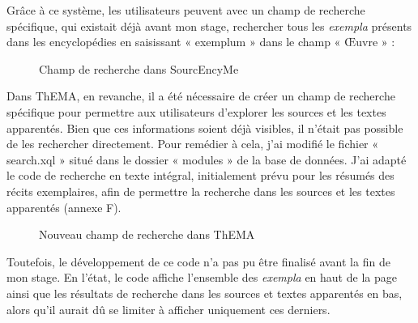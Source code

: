 Grâce à ce système, les utilisateurs peuvent avec un champ de recherche spécifique, qui existait déjà avant mon stage, rechercher tous les \textit{exempla} présents dans les encyclopédies en saisissant « exemplum » dans le champ « Œuvre » : \\

\begin{figure}[H]
	\centering
	\caption{Champ de recherche dans SourcEncyMe}
\end{figure}

Dans ThEMA, en revanche, il a été nécessaire de créer un champ de recherche spécifique pour permettre aux utilisateurs d'explorer les sources et les textes apparentés. Bien que ces informations soient déjà visibles, il n'était pas possible de les rechercher directement. Pour remédier à cela, j'ai modifié le fichier « search.xql » situé dans le dossier « modules » de la base de données. J'ai adapté le code de recherche en texte intégral, initialement prévu pour les résumés des récits exemplaires, afin de permettre la recherche dans les sources et les textes apparentés (annexe F). \\

\begin{figure}[H]
	\centering
	\caption{Nouveau champ de recherche dans ThEMA}
\end{figure}

Toutefois, le développement de ce code n'a pas pu être finalisé avant la fin de mon stage. En l'état, le code affiche l'ensemble des \textit{exempla} en haut de la page ainsi que les résultats de recherche dans les sources et textes apparentés en bas, alors qu'il aurait dû se limiter à afficher uniquement ces derniers. \\

